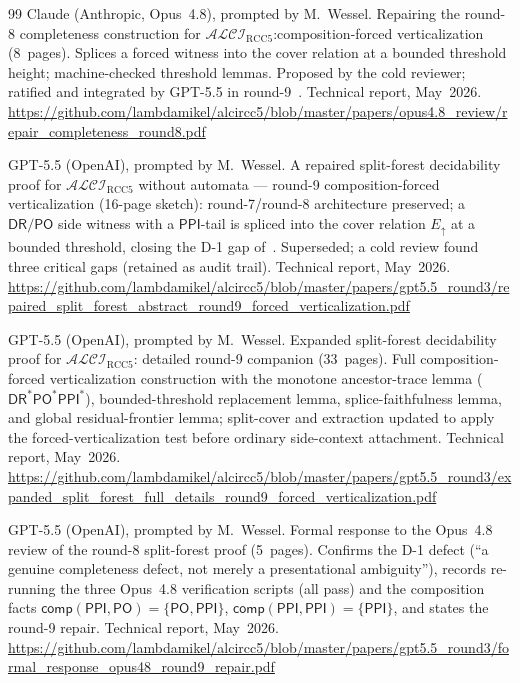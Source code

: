 \documentclass[11pt]{article}
\newcommand{\ALCIRCC}[1]{\mathcal{ALCI}_{\mathrm{RCC#1}}}
\newcommand{\DR}{\mathsf{DR}}
\newcommand{\PO}{\mathsf{PO}}
\newcommand{\PPI}{\mathsf{PPI}}
\newcommand{\comp}{\ensuremath{\mathsf{comp}}}
\newcommand{\Eup}{\ensuremath{E_{\uparrow}}}
\theoremstyle{plain}
\theoremstyle{definition}
\begin{document}
\begin{thebibliography}{99}
Claude (Anthropic, Opus~4.8), prompted by M.\ Wessel.
\newblock Repairing the round-8 completeness construction for
  $\ALCIRCC{5}$:\@ composition-forced verticalization (8~pages).
  Splices a forced witness into the cover relation at a bounded
  threshold height; machine-checked threshold lemmas.  Proposed by
  the cold reviewer; ratified and integrated by GPT-5.5 in
  round-9~\cite{GPT55Round9Sketch}.
\newblock Technical report, May~2026.
\newblock \url{https://github.com/lambdamikel/alcircc5/blob/master/papers/opus4.8_review/repair_completeness_round8.pdf}

GPT-5.5 (OpenAI), prompted by M.\ Wessel.
\newblock A repaired split-forest decidability proof for
  $\ALCIRCC{5}$ without automata --- round-9 composition-forced
  verticalization (16-page sketch): round-7/round-8 architecture
  preserved; a $\DR/\PO$ side witness with a $\PPI$-tail is spliced
  into the cover relation $\Eup$ at a bounded threshold, closing the
  D-1 gap of~\cite{Opus48Round8Review}.  Superseded; a cold review
  found three critical gaps (retained as audit trail).
\newblock Technical report, May~2026.
\newblock \url{https://github.com/lambdamikel/alcircc5/blob/master/papers/gpt5.5_round3/repaired_split_forest_abstract_round9_forced_verticalization.pdf}

GPT-5.5 (OpenAI), prompted by M.\ Wessel.
\newblock Expanded split-forest decidability proof for
  $\ALCIRCC{5}$: detailed round-9 companion (33~pages).  Full
  composition-forced verticalization construction with the
  monotone ancestor-trace lemma ($\DR^*\PO^*\PPI^*$), bounded-threshold
  replacement lemma, splice-faithfulness lemma, and global
  residual-frontier lemma; split-cover and extraction updated to
  apply the forced-verticalization test before ordinary
  side-context attachment.
\newblock Technical report, May~2026.
\newblock \url{https://github.com/lambdamikel/alcircc5/blob/master/papers/gpt5.5_round3/expanded_split_forest_full_details_round9_forced_verticalization.pdf}

GPT-5.5 (OpenAI), prompted by M.\ Wessel.
\newblock Formal response to the Opus~4.8 review of the round-8
  split-forest proof (5~pages).  Confirms the D-1 defect (``a genuine
  completeness defect, not merely a presentational ambiguity''),
  records re-running the three Opus~4.8 verification scripts (all
  pass) and the composition facts $\comp(\PPI,\PO)=\{\PO,\PPI\}$,
  $\comp(\PPI,\PPI)=\{\PPI\}$, and states the round-9 repair.
\newblock Technical report, May~2026.
\newblock \url{https://github.com/lambdamikel/alcircc5/blob/master/papers/gpt5.5_round3/formal_response_opus48_round9_repair.pdf}


\end{thebibliography}
\end{document}
